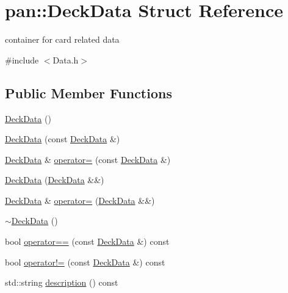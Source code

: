 \hypertarget{structpan_1_1_deck_data}{}\section{pan\+:\+:Deck\+Data Struct Reference}
\label{structpan_1_1_deck_data}


container for card related data  




{\ttfamily \#include $<$Data.\+h$>$}

\subsection*{Public Member Functions}
\begin{DoxyCompactItemize}
\item 
\hyperlink{structpan_1_1_deck_data_a4db0e346f5a1581e0b0b776d87e18de8}{Deck\+Data} ()
\item 
\hyperlink{structpan_1_1_deck_data_ac83d54bb32192aa5903174879dc7826d}{Deck\+Data} (const \hyperlink{structpan_1_1_deck_data}{Deck\+Data} \&)
\item 
\hyperlink{structpan_1_1_deck_data}{Deck\+Data} \& \hyperlink{structpan_1_1_deck_data_aa4b750d6147c8522d5099f922be040d7}{operator=} (const \hyperlink{structpan_1_1_deck_data}{Deck\+Data} \&)
\item 
\hyperlink{structpan_1_1_deck_data_a223e1e7503b729cc9707864ccc5951b7}{Deck\+Data} (\hyperlink{structpan_1_1_deck_data}{Deck\+Data} \&\&)
\item 
\hyperlink{structpan_1_1_deck_data}{Deck\+Data} \& \hyperlink{structpan_1_1_deck_data_a894f4861a235461ecec7d61606db9247}{operator=} (\hyperlink{structpan_1_1_deck_data}{Deck\+Data} \&\&)
\item 
\hyperlink{structpan_1_1_deck_data_acd2924656a86c70614628a2aba59b902}{$\sim$\+Deck\+Data} ()
\item 
bool \hyperlink{structpan_1_1_deck_data_a91f72c68f7fc518e1f3501005d258fd4}{operator==} (const \hyperlink{structpan_1_1_deck_data}{Deck\+Data} \&) const
\item 
bool \hyperlink{structpan_1_1_deck_data_a87446320936053a6b58108ce55cb782b}{operator!=} (const \hyperlink{structpan_1_1_deck_data}{Deck\+Data} \&) const
\item 
std\+::string \hyperlink{structpan_1_1_deck_data_a9ca3f6cacef27ea9cbd43df54f1be33f}{description} () const
\end{DoxyCompactItemize}
